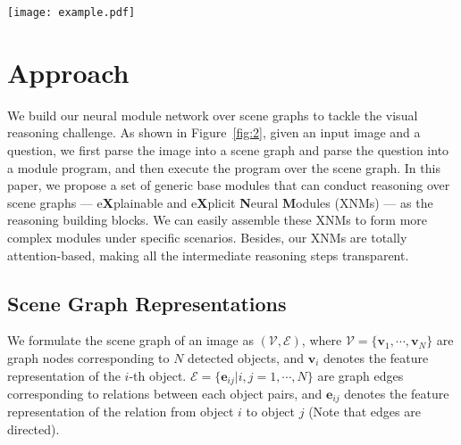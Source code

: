 \documentclass[10pt,twocolumn,letterpaper]{article}
\begin{document}
\begin{figure*}[ht]
\texttt{[image: example.pdf]}
\caption{To answer a question about an image, we need to 1) parse the image into a scene graph, 2) parse the question into a module program, and 3) reasoning over the scene graph. Here, we show the reasoning details of an example from CLEVR. The nodes and edges in red are attended. \texttt{Scene} is a dummy placeholder module that attends all nodes. All intermediate steps of our XNMs are explainable and explicit.}
\label{fig:2}
\vspace{-0.4cm}
\end{figure*}







\vspace{-0.2cm}
\section{Approach}
We build our neural module network over scene graphs to tackle the visual reasoning challenge.
As shown in Figure~\ref{fig:2}, given an input image and a question, we first parse the image into a scene graph and parse the question into a module program, and then execute the program over the scene graph. In this paper, we propose a set of generic base modules that can conduct reasoning over scene graphs --- e\textbf{X}plainable and e\textbf{X}plicit \textbf{N}eural \textbf{M}odules (XNMs) --- as the reasoning building blocks. We can easily assemble these XNMs to form more complex modules under specific scenarios. Besides, our XNMs are totally attention-based, making all the intermediate reasoning steps transparent.

\vspace{-0.1cm}
\subsection{Scene Graph Representations}
\vspace{-0.1cm}
We formulate the scene graph of an image as $(\mathcal{V}, \mathcal{E})$, where $\mathcal{V}=\{\mathbf{v}_1, \cdots, \mathbf{v}_N\}$ are graph nodes corresponding to $N$ detected objects, and $\mathbf{v}_i$ denotes the feature representation of the $i$-th object.
$\mathcal{E}=\{\mathbf{e}_{ij} | i,j=1,\cdots,N\}$ are graph edges corresponding to relations between each object pairs, and $\mathbf{e}_{ij}$ denotes the feature representation of the relation from object $i$ to object $j$ (Note that edges are directed).
\end{document}
